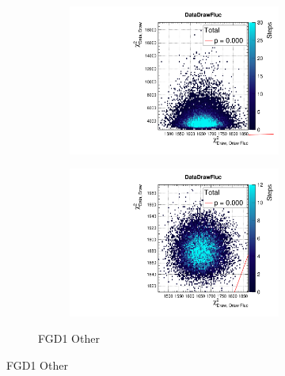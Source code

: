 \begin{figure}[h]
\begin{subfigure}[t]{\textwidth}
\begin{subfigure}[t]{0.24\textwidth}
\includegraphics[width=\textwidth, trim={0mm 0mm 0mm 8mm}, clip,page=29]{figures/mach3/data/priorpred/2017b_NewDet_3Xsec_4Det_5Flux_NewXSecTune_Data_merge_PriorPred_procs}
\end{subfigure}
\begin{subfigure}[t]{0.24\textwidth}
	\includegraphics[width=\textwidth, trim={0mm 0mm 0mm 8mm}, clip,page=29]{figures/mach3/data/postpred/2017b_NewData_NewDet_UpdXsecStep_2Xsec_4Det_5Flux_0_PostPred_procs}
\end{subfigure}
\caption{FGD1 Other}
\end{subfigure}


\end{figure}
